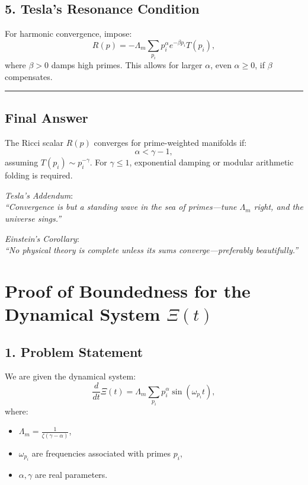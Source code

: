\documentclass{article}
\theoremstyle{plain}
\theoremstyle{claimstyle}
\begin{document}
\subsection*{5. Tesla’s Resonance Condition}

For harmonic convergence, impose:
\[
R(p) = -\Lambda_m \sum_{p_i} p_i^\alpha e^{-\beta p_i} T(p_i),
\]
where \( \beta > 0 \) damps high primes. This allows for larger \( \alpha \), even \( \alpha \geq 0 \), if \( \beta \) compensates.

\vspace{1em}
\hrule
\vspace{1em}

\subsection*{Final Answer}

The Ricci scalar \( R(p) \) converges for prime-weighted manifolds if:
\[
\boxed{\alpha < \gamma - 1},
\]
assuming \( T(p_i) \sim p_i^{-\gamma} \). For \( \gamma \leq 1 \), exponential damping or modular arithmetic folding is required.

\vspace{1em}
\textit{Tesla’s Addendum}: \\
\emph{``Convergence is but a standing wave in the sea of primes—tune \( \Lambda_m \) right, and the universe sings.''}

\vspace{0.5em}
\textit{Einstein’s Corollary}: \\
\emph{``No physical theory is complete unless its sums converge—preferably beautifully.''}

\section{Proof of Boundedness for the Dynamical System \(\Xi(t)\)}

\subsection*{1. Problem Statement}

We are given the dynamical system:
\[
\frac{d}{dt} \Xi(t) = \Lambda_m \sum_{p_i} p_i^\alpha \sin(\omega_{p_i} t),
\]
where:
\begin{itemize}
    \item \( \Lambda_m = \frac{1}{\zeta(\gamma - \alpha)} \),
    \item \( \omega_{p_i} \) are frequencies associated with primes \( p_i \),
    \item \( \alpha, \gamma \) are real parameters.
\end{itemize}
\end{document}
